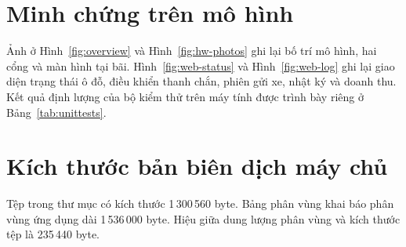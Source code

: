 \section{Minh chứng trên mô hình}
Ảnh ở Hình~\ref{fig:overview} và Hình~\ref{fig:hw-photos} ghi lại bố trí mô hình, hai cổng và màn hình tại bãi. Hình~\ref{fig:web-status} và Hình~\ref{fig:web-log} ghi lại giao diện trạng thái ô đỗ, điều khiển thanh chắn, phiên gửi xe, nhật ký và doanh thu. Kết quả định lượng của bộ kiểm thử trên máy tính được trình bày riêng ở Bảng~\ref{tab:unittests}.

\section{Kích thước bản biên dịch máy chủ}
Tệp  trong thư mục  có kích thước 1\,300\,560 byte. Bảng phân vùng  khai báo phân vùng ứng dụng  dài 1\,536\,000 byte. Hiệu giữa dung lượng phân vùng và kích thước tệp là 235\,440 byte.
